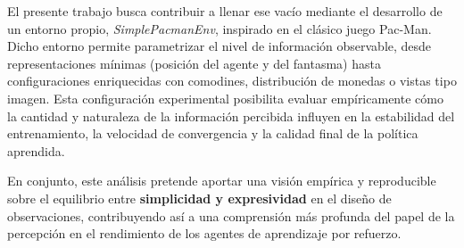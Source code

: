 El presente trabajo busca contribuir a llenar ese vacío mediante el desarrollo de un entorno propio, \textit{SimplePacmanEnv}, inspirado en el clásico juego Pac-Man.  
Dicho entorno permite parametrizar el nivel de información observable, desde representaciones mínimas (posición del agente y del fantasma) hasta configuraciones enriquecidas con comodines, distribución de monedas o vistas tipo imagen.  
Esta configuración experimental posibilita evaluar empíricamente cómo la cantidad y naturaleza de la información percibida influyen en la estabilidad del entrenamiento, la velocidad de convergencia y la calidad final de la política aprendida.

En conjunto, este análisis pretende aportar una visión empírica y reproducible sobre el equilibrio entre \textbf{simplicidad y expresividad} en el diseño de observaciones, contribuyendo así a una comprensión más profunda del papel de la percepción en el rendimiento de los agentes de aprendizaje por refuerzo.
